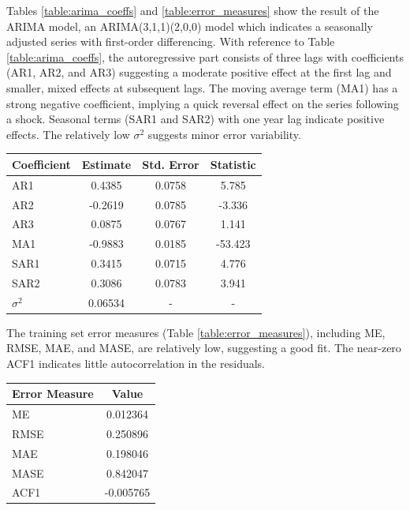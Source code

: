 \documentclass[11pt,preprint, authoryear]{elsarticle}
\let\origtable\table
\let\endorigtable\endtable
\renewenvironment{table}[1][2] {
    \expandafter\origtable\expandafter[H]
} {
    \endorigtable
}
\numberwithin{equation}{section}
\numberwithin{figure}{section}
\numberwithin{table}{section}
\begin{document}
Tables \ref{table:arima_coeffs} and \ref{table:error_measures} show the
result of the ARIMA model, an ARIMA(3,1,1)(2,0,0) model which indicates
a seasonally adjusted series with first-order differencing. With
reference to Table \ref{table:arima_coeffs}, the autoregressive part
consists of three lags with coefficients (AR1, AR2, and AR3) suggesting
a moderate positive effect at the first lag and smaller, mixed effects
at subsequent lags. The moving average term (MA1) has a strong negative
coefficient, implying a quick reversal effect on the series following a
shock. Seasonal terms (SAR1 and SAR2) with one year lag indicate
positive effects. The relatively low \(\sigma^2\) suggests minor error
variability.

\begin{table}[ht]
\centering
\caption{ARIMA Model Coefficients}
\label{table:arima_coeffs}
\begin{tabular}{lccc}
\hline
Coefficient & Estimate & Std. Error & Statistic \\
\hline
AR1         & 0.4385   & 0.0758     & 5.785     \\
AR2         & -0.2619  & 0.0785     & -3.336    \\
AR3         & 0.0875   & 0.0767     & 1.141     \\
MA1         & -0.9883  & 0.0185     & -53.423   \\
SAR1        & 0.3415   & 0.0715     & 4.776     \\
SAR2        & 0.3086   & 0.0783     & 3.941     \\
\(\sigma^2\)    & 0.06534       & -     & -     \\
\hline
\end{tabular}
\end{table}

The training set error measures (Table \ref{table:error_measures}),
including ME, RMSE, MAE, and MASE, are relatively low, suggesting a good
fit. The near-zero ACF1 indicates little autocorrelation in the
residuals.

\begin{table}[ht]
\centering
\caption{Error Measures of the ARIMA Model}
\label{table:error_measures}
\begin{tabular}{lc}
\hline
Error Measure & Value \\
\hline
ME            & 0.012364 \\
RMSE          & 0.250896 \\
MAE           & 0.198046 \\
MASE          & 0.842047 \\
ACF1          & -0.005765\\
\hline
\end{tabular}
\end{table}
\end{document}
